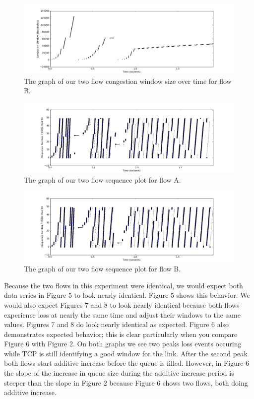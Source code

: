 \documentclass[11pt]{article}
\begin{document}
\begin{figure}[H]
\caption{The graph of our two flow congestion window size over time for flow B.}
  \label{figure8}
    \centering
    \includegraphics[width=\linewidth]{2f2_window.png}
\end{figure}

\begin{figure}[H]
\caption{The graph of our two flow sequence plot for flow A.}
  \label{figure9}
    \centering
    \includegraphics[width=\linewidth]{2f1_seq.png}
\end{figure}

\begin{figure}[H]
\caption{The graph of our two flow sequence plot for flow B.}
  \label{figure10}
    \centering
    \includegraphics[width=\linewidth]{2f2_seq.png}
\end{figure}

Because the two flows in this experiment were identical, we would expect both data series in Figure 5 to look nearly identical. Figure 5 shows this behavior. We would also expect Figures 7 and 8 to look nearly identical because both flows experience loss at nearly the same time and adjust their windows to the same values. Figures 7 and 8 do look nearly identical as expected. Figure 6 also demonstrates expected behavior; this is clear particularly when you compare Figure 6 with Figure 2. On both graphs we see two peaks loss events occuring while TCP is still identifying a good window for the link. After the second peak both flows start additive increase before the queue is filled. However, in Figure 6 the slope of the increase in queue size during the additive increase period is steeper than the slope in Figure 2 because Figure 6 shows two flows, both doing additive increase. 
\end{document}

